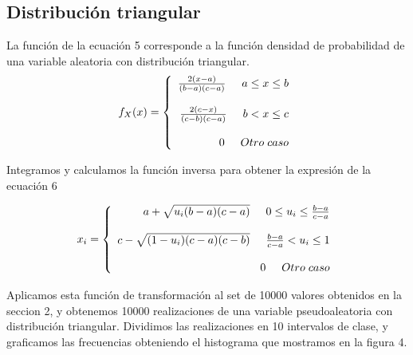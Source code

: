 \documentclass[10pt,journal,compsoc]{IEEEtran}
\begin{document}
\subsection{Distribuci\'on triangular}
La funci\'on de la ecuaci\'on 5 corresponde a la funci\'on densidad de probabilidad de una variable aleatoria con distribuci\'on triangular.
\begin{equation}
   f_{X}(x) = \left\{
  \begin{array}{rl}
	\frac{2(x-a)}{(b-a)(c-a)} \hspace{0.5cm} a \le x \le b\\\\
	\frac{2(c-x)}{(c-b)(c-a)} \hspace{0.5cm} b < x \le c\\\\
	0 \hspace{0.5 cm} Otro \hspace{0.1cm} caso
  \end{array} \right.
\end{equation}


Integramos y calculamos la funci\'on inversa para obtener la expresi\'on de la ecuaci\'on 6

\begin{equation}
 x_i = \left\{
  \begin{array}{rl}
	a+\sqrt{u_i(b-a)(c-a)} \hspace{0.5cm} 0 \le u_i \le \frac{b-a}{c-a}\\\\
	c-\sqrt{(1-u_i)(c-a)(c-b)} \hspace{0.5cm} \frac{b-a}{c-a} < u_i \le 1\\\\
	0 \hspace{0.5 cm} Otro \hspace{0.1cm} caso
  \end{array} \right.
\end{equation}

Aplicamos esta funci\'on de transformaci\'on al set de 10000 valores obtenidos en la seccion 2, y obtenemos
10000 realizaciones de una variable pseudoaleatoria con distribuci\'on triangular.  Dividimos las realizaciones
en 10 intervalos de clase, y graficamos las frecuencias obteniendo el histograma que mostramos en la figura 4.
\end{document}
